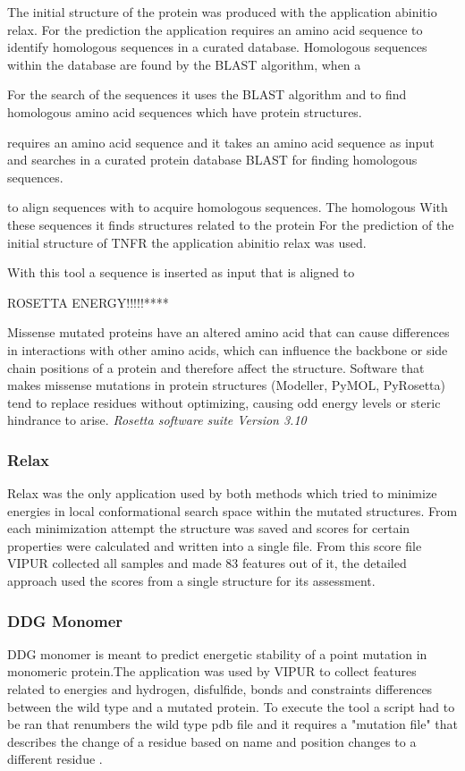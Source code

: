  The initial structure of the protein was produced with the application abinitio relax. For the prediction the application requires an amino acid sequence to identify homologous sequences in a curated database. Homologous sequences within the database are found by the BLAST algorithm, when a

For the search of the sequences it uses the BLAST algorithm and to find homologous amino acid sequences which have protein structures.

requires an amino acid sequence and  it takes an amino acid sequence as input and searches in a curated protein database BLAST for finding homologous sequences. 


to align sequences with to acquire homologous sequences.  The homologous With these sequences it finds structures related to the protein
For the prediction of the initial structure of TNFR the application abinitio relax was used. 

With this tool a sequence is inserted as input that is aligned to 

ROSETTA ENERGY!!!!!****


Missense mutated proteins have an altered amino acid that can cause differences in interactions with other amino acids, which can influence the backbone or side chain positions of a protein and therefore affect the structure. Software that makes missense mutations in protein structures (Modeller, PyMOL, PyRosetta) tend to replace residues without optimizing, causing odd energy levels or steric hindrance to arise.
\label{subsec:MM_Rosetta}
\newline
\textit{Rosetta software suite Version 3.10}

\subsubsection{Relax}
Relax was the only application used by both methods which tried to minimize energies in local conformational search space \cite{} within the mutated structures. From each minimization attempt the structure was saved and scores for certain properties were calculated and written into a single file. From this score file VIPUR collected all samples and made 83 features out of it, the detailed approach used the scores from a single structure for its assessment.
\label{subsubsec:MM_Relax}

\subsubsection{DDG Monomer}
DDG monomer is meant to predict energetic stability of a point mutation in  monomeric protein.The application was used by VIPUR to collect features related to energies and hydrogen, disfulfide, bonds and constraints differences between the wild type and a mutated protein. To execute the tool a script had to be ran that renumbers the wild type pdb file and it requires a "mutation file" that describes the change of a residue based on name and position changes to a different residue \cite{}.
\label{subsubsec:MM_DDG_Monomer}

